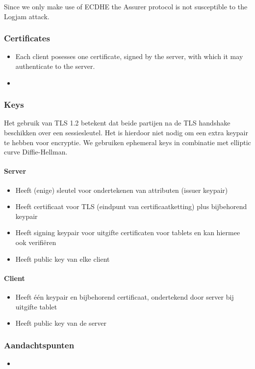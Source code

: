 Since we only make use of ECDHE the Assurer protocol is not susceptible to the Logjam attack.


\subsubsection{Certificates}
\begin{itemize}
	\item Each client posesses one certificate, signed by the server, with which it may authenticate to the server.
  \item 
\end{itemize}



\subsubsection{Keys}
Het gebruik van TLS 1.2 betekent dat beide partijen na de TLS handshake beschikken over een sessiesleutel. Het is hierdoor niet nodig om een extra keypair te hebben voor encryptie. We gebruiken ephemeral keys in combinatie met elliptic curve Diffie-Hellman. 

\paragraph{Server}
\begin{itemize}
	\item Heeft (enige) sleutel voor ondertekenen van attributen (issuer keypair)
  \item Heeft certificaat voor TLS (eindpunt van certificaatketting) plus bijbehorend keypair
  \item Heeft signing keypair voor uitgifte certificaten voor tablets en kan hiermee ook verifiëren
  \item Heeft public key van elke client
\end{itemize}

\paragraph{Client}
\begin{itemize}
	\item Heeft één keypair en bijbehorend certificaat, ondertekend door server bij uitgifte tablet
  \item Heeft public key van de server
\end{itemize}

\subsubsection{Aandachtspunten}
\begin{itemize}
  \item 
\end{itemize}


